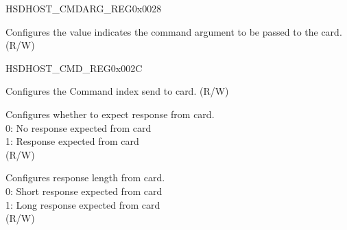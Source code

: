 \begin{register}{H}{SDHOST\_CMDARG\_REG}{0x0028}\label{regdesc:SDHOSTCMDARGREG}
%
\regnewline%
\begin{regdesc}\begin{reglist}
\label{fielddesc:SDHOSTCMDARGREG}\item [SDHOST\_CMDARG\_REG] Configures the value indicates the command argument to be passed to the card. (R/W)
\end{reglist}\end{regdesc}
\end{register}


\begin{register}{H}{SDHOST\_CMD\_REG}{0x002C}\label{regdesc:SDHOSTCMDREG}
%
%
%
%
%
%
%
%
%
%
%
%
%
%
%
%
%
%
%
%
\regnewline%
\begin{regdesc}\begin{reglist}
\label{fielddesc:SDHOSTCMDINDEX}\item [SDHOST\_CMD\_INDEX] Configures the Command index send to card. (R/W)
\label{fielddesc:SDHOSTRESPONSEEXPECT}\item [SDHOST\_RESPONSE\_EXPECT] Configures whether to expect response from card.\\0: No response expected from card\\1: Response expected from card\\(R/W)
\label{fielddesc:SDHOSTRESPONSELENGTH}\item [SDHOST\_RESPONSE\_LENGTH] Configures response length from card.\\0: Short response expected from card\\1: Long response expected from card\\(R/W)

\end{reglist}
\end{regdesc}
\end{register}
